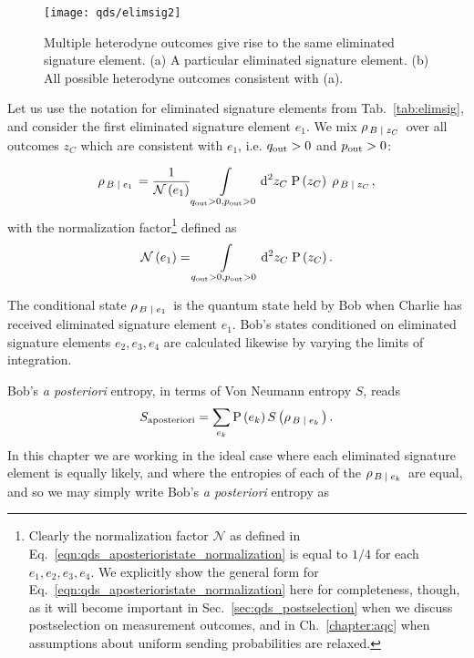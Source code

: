 \begin{figure}[htp]
\captionsetup{width=0.8\linewidth}
\centering
\texttt{[image: qds/elimsig2]}
\caption{\label{fig:qds_elimsig2} Multiple heterodyne outcomes give rise to the same eliminated signature element. (a) A particular eliminated signature element. (b) All possible heterodyne outcomes consistent with (a).}
\end{figure}



Let us use the notation for eliminated signature elements from Tab.~\ref{tab:elimsig}, and consider the first eliminated signature element $e_1$. We mix $\rho_{\left. B \; \middle| \; z_C \right.}$ over all outcomes $z_C$ which are consistent with $e_1$, i.e. $q_{\text{out}} > 0$ and $p_{\text{out}} > 0$:

\begin{equation}\label{eqn:qds_aposterioristate}
\rho_{\left. B \; \middle| \; e_1\right.} = \frac{1}{\mathcal{N}\left(e_1\right)} \int\limits_{q_{\text{out}}>0, p_{\text{out}}>0} \mathop{}\!\mathrm{d^2} z_C \; \text{P}\left(z_C\right) \; \rho_{\left. B \; \middle| \;  z_C\right.},
\end{equation}
with the normalization factor\footnote{Clearly the normalization factor $\mathcal{N}$ as defined in Eq.~\ref{eqn:qds_aposterioristate_normalization} is equal to $1/4$ for each $e_1, e_2, e_3, e_4$. We explicitly show the general form for Eq.~\ref{eqn:qds_aposterioristate_normalization} here for completeness, though, as it will become important in Sec.~\ref{sec:qds_postselection} when we discuss postselection on measurement outcomes, and in Ch.~\ref{chapter:aqc} when assumptions about uniform sending probabilities are relaxed.} defined as
\begin{equation}\label{eqn:qds_aposterioristate_normalization}
\mathcal{N}\left(e_1\right) = \int\limits_{q_{\text{out}}>0, p_{\text{out}}>0} \mathop{}\!\mathrm{d^2} z_C \; \text{P}\left(z_C\right).
\end{equation}

\noindent The conditional state $\rho_{\left. B\; \middle| \; e_1\right.}$ is the quantum state held by Bob when Charlie has received eliminated signature element $e_1$. Bob's states conditioned on eliminated signature elements $e_2, e_3, e_4$ are calculated likewise by varying the limits of integration.

Bob's \emph{a posteriori} entropy, in terms of Von Neumann entropy $S$, reads
\begin{equation}
S_{\text{aposteriori}} = \sum_{e_k} \text{P}\left(e_k\right) S\left(\rho_{\left. B \; \middle| \; e_k\right.}\right).
\end{equation}
In this chapter we are working in the ideal case where each eliminated signature element is equally likely, and where the entropies of each of the $\rho_{\left. B \; \middle| \; e_k\right.}$ are equal, and so we may simply write Bob's \emph{a posteriori} entropy as

